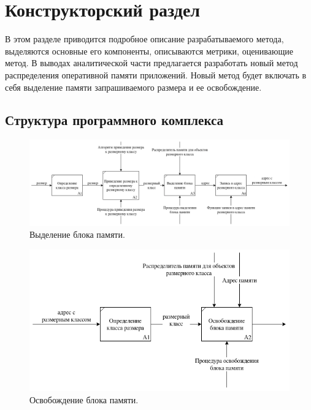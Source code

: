 \chapter{Конструкторский раздел}
В этом разделе приводится подробное описание разрабатываемого метода, выделяются основные его компоненты, описываются метрики, оценивающие метод. В выводах аналитической части предлагается разработать новый метод распределения оперативной памяти приложений. Новый метод будет включать в себя выделение памяти запрашиваемого размера и ее освобождение.

\section{Структура программного комплекса}
\begin{figure}[!h]
	\begin{center}
		\includegraphics[scale=0.5]{images/block-allocation.png}
		\caption{Выделение блока памяти.}
		\label{block-allocation}
	\end{center}
\end{figure}

\begin{figure}[!h]
	\begin{center}
		\includegraphics[scale=0.5]{images/block-free.png}
		\caption{Освобождение блока памяти.}
		\label{block-free}
	\end{center}
\end{figure}

